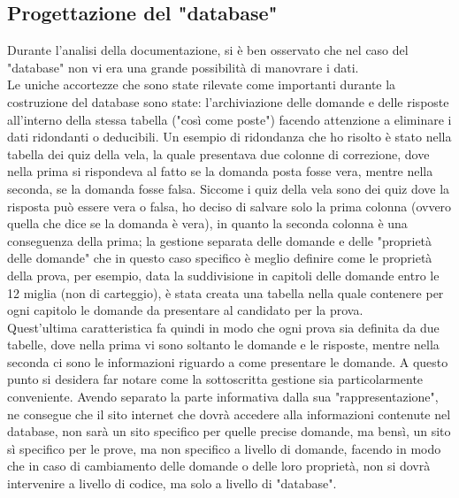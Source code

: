 \subsection{Progettazione del "database"}
Durante l'analisi della documentazione, si è ben osservato che nel caso del "database" non vi era una grande possibilità di manovrare i dati.\\
Le uniche accortezze che sono state rilevate come importanti durante la costruzione del database sono state: l'archiviazione delle domande e delle risposte all'interno della stessa tabella ("così come poste") facendo attenzione a eliminare i dati ridondanti o deducibili. Un esempio di ridondanza che ho risolto è stato nella tabella dei quiz della vela, la quale presentava due colonne di correzione, dove nella prima si rispondeva al fatto se la domanda posta fosse vera, mentre nella seconda, se la domanda fosse falsa. Siccome i quiz della vela sono dei quiz dove la risposta può essere vera o falsa, ho deciso di salvare solo la prima colonna (ovvero quella che dice se la domanda è vera), in quanto la seconda colonna è una conseguenza della prima; la gestione separata delle domande e delle "proprietà delle domande" che in questo caso specifico è meglio definire come le proprietà della prova, per esempio, data la suddivisione in capitoli delle domande entro le 12 miglia (non di carteggio), è stata creata una tabella nella quale contenere per ogni capitolo le domande da presentare al candidato per la prova.\\
Quest'ultima caratteristica fa quindi in modo che ogni prova sia definita da due tabelle, dove nella prima vi sono soltanto le domande e le risposte, mentre nella seconda ci sono le informazioni riguardo a come presentare le domande. A questo punto si desidera far notare come la sottoscritta gestione sia particolarmente conveniente. Avendo separato la parte informativa dalla sua "rappresentazione", ne consegue che il sito internet che dovrà accedere alla informazioni contenute nel database, non sarà un sito specifico per quelle precise domande, ma bensì, un sito sì specifico per le prove, ma non specifico a livello di domande, facendo in modo che in caso di cambiamento delle domande o delle loro proprietà, non si dovrà intervenire a livello di codice, ma solo a livello di "database".